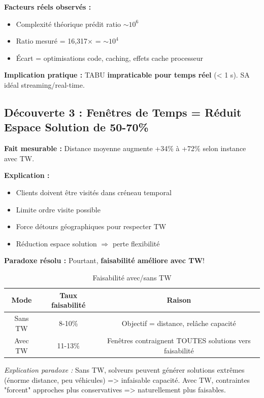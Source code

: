 \documentclass[12pt,a4paper,twoside]{report}
\begin{document}
\textbf{Facteurs réels observés :}
\begin{itemize}
    \item Complexité théorique prédit ratio $\sim 10^6$
    \item Ratio mesuré = 16,317× = $\sim 10^4$
    \item Écart = optimisations code, caching, effets cache processeur
\end{itemize}

\textbf{Implication pratique :} TABU \textbf{impraticable pour temps réel} (< 1 s). SA idéal streaming/real-time.

\subsection{Découverte 3 : Fenêtres de Temps = Réduit Espace Solution de 50-70\%}

\textbf{Fait mesurable :} Distance moyenne augmente +34\% à +72\% selon instance avec TW.

\textbf{Explication :}

\begin{itemize}
    \item Clients doivent être visités dans créneau temporal
    \item Limite ordre visite possible
    \item Force détours géographiques pour respecter TW
    \item Réduction espace solution $\Rightarrow$ perte flexibilité
\end{itemize}

\textbf{Paradoxe résolu :} Pourtant, \textbf{faisabilité améliore avec TW}!

\begin{table}[H]
    \centering
    \caption{Faisabilité avec/sans TW}
    \begin{tabular}{|c|c|c|}
        \hline
        \textbf{Mode} & \textbf{Taux faisabilité} & \textbf{Raison}                                         \\
        \hline
        Sans TW       & 8-10\%                    & Objectif = distance, relâche capacité                   \\
        Avec TW       & 11-13\%                   & Fenêtres contraignent TOUTES solutions vers faisabilité \\
        \hline
    \end{tabular}
\end{table}

\textit{Explication paradoxe :} Sans TW, solveurs peuvent générer solutions extrêmes (énorme distance, peu véhicules) => infaisable capacité. Avec TW, contraintes "forcent" approches plus conservatives => naturellement plus faisables.
\end{document}

